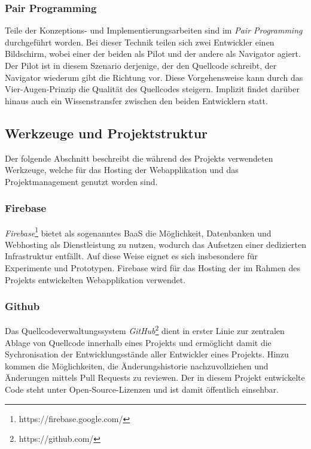 \subsubsection{Pair Programming}
\label{pair_programming}

Teile der Konzeptions- und Implementierungsarbeiten sind im \emph{Pair Programming} durchgeführt worden. Bei dieser Technik teilen sich zwei Entwickler einen Bildschirm, wobei einer der beiden als Pilot und der andere als Navigator agiert. Der Pilot ist in diesem Szenario derjenige, der den Quellcode schreibt, der Navigator wiederum gibt die Richtung vor. Diese Vorgehensweise kann durch das Vier-Augen-Prinzip die Qualität des Quellcodes steigern. Implizit findet darüber hinaus auch ein Wissenstransfer zwischen den beiden Entwicklern statt.

\subsection{Werkzeuge und Projektstruktur}
\label{werkzeuge_und_projektstruktur}

Der folgende Abschnitt beschreibt die während des Projekts verwendeten Werkzeuge, welche für das Hosting der Webapplikation und das Projektmanagement genutzt worden sind.

\subsubsection{Firebase}
\label{firebase}

\emph{Firebase}\footnote{https://firebase.google.com/} bietet als sogenanntes \ac{BaaS} die Möglichkeit, Datenbanken und Webhosting als Dienstleistung zu nutzen, wodurch das Aufsetzen einer dedizierten Infrastruktur entfällt. Auf diese Weise eignet es sich insbesondere für Experimente und Prototypen. Firebase wird für das Hosting der im Rahmen des Projekts entwickelten Webapplikation verwendet.

\subsubsection{Github}
\label{github}

Das Quellcodeverwaltungssystem \emph{GitHub}\footnote{https://github.com/} dient in erster Linie zur zentralen Ablage von Quellcode innerhalb eines Projekts und ermöglicht damit die Sychronisation der Entwicklungsstände aller Entwickler eines Projekts. Hinzu kommen die Möglichkeiten, die Änderungshistorie nachzuvollziehen und Änderungen mittels Pull Requests zu reviewen. Der in diesem Projekt entwickelte Code steht unter Open-Source-Lizenzen und ist damit öffentlich einsehbar.


